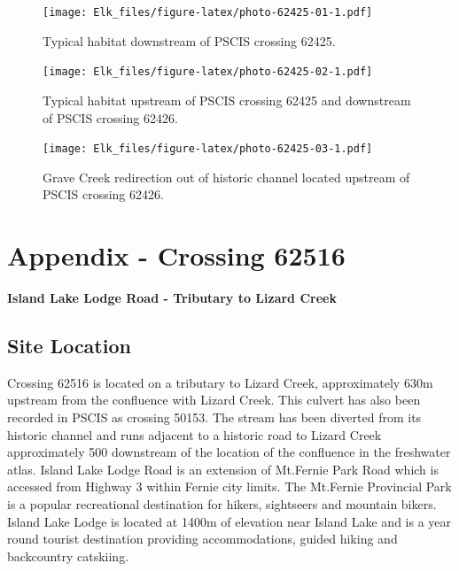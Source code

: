 \documentclass[
]{book}
\begin{document}
\begin{figure}
\centering
\texttt{[image: Elk\_files/figure-latex/photo-62425-01-1.pdf]}
\caption{\label{fig:photo-62425-01}Typical habitat downstream of PSCIS crossing 62425.}
\end{figure}

\begin{figure}
\centering
\texttt{[image: Elk\_files/figure-latex/photo-62425-02-1.pdf]}
\caption{\label{fig:photo-62425-02}Typical habitat upstream of PSCIS crossing 62425 and downstream of PSCIS crossing 62426.}
\end{figure}

\begin{figure}
\centering
\texttt{[image: Elk\_files/figure-latex/photo-62425-03-1.pdf]}
\caption{\label{fig:photo-62425-03}Grave Creek redirection out of historic channel located upstream of PSCIS crossing 62426.}
\end{figure}

\hypertarget{appendix---crossing-62516}{%
\chapter*{Appendix - Crossing 62516}\label{appendix---crossing-62516}}

\textbf{Island Lake Lodge Road - Tributary to Lizard Creek}

\hypertarget{site-location-5}{%
\section*{Site Location}\label{site-location-5}}

Crossing 62516 is located on a tributary to Lizard Creek, approximately 630m upstream from the confluence with Lizard Creek. This culvert has also been recorded in PSCIS as crossing 50153. The stream has been diverted from its historic channel and runs adjacent to a historic road to Lizard Creek approximately 500 downstream of the location of the confluence in the freshwater atlas. Island Lake Lodge Road is an extension of Mt.Fernie Park Road which is accessed from Highway 3 within Fernie city limits. The Mt.Fernie Provincial Park is a popular recreational destination for hikers, sightseers and mountain bikers. Island Lake Lodge is located at 1400m of elevation near Island Lake and is a year round tourist destination providing accommodations, guided hiking and backcountry catskiing.
\end{document}
